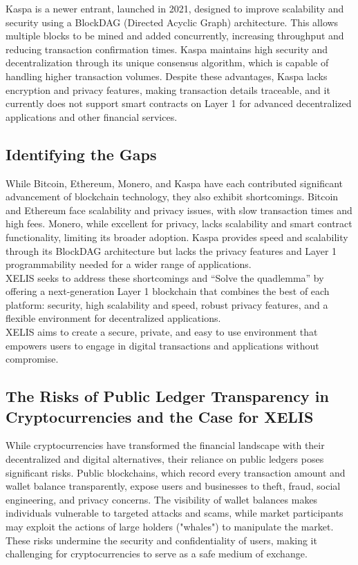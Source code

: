 \documentclass[10pt,a4paper,twocolumn]{article}
\begin{document}
Kaspa is a newer entrant, launched in 2021, designed to improve scalability and security using a BlockDAG (Directed Acyclic Graph) architecture. This allows multiple blocks to be mined and added concurrently, increasing throughput and reducing transaction confirmation times. Kaspa maintains high security and decentralization through its unique consensus algorithm, which is capable of handling higher transaction volumes. Despite these advantages, Kaspa lacks encryption and privacy features, making transaction details traceable, and it currently does not support smart contracts on Layer 1 for advanced decentralized applications and other financial services.\\


\subsection{Identifying the Gaps}

While Bitcoin, Ethereum, Monero, and Kaspa have each contributed significant advancement of blockchain technology, they also exhibit shortcomings. Bitcoin and Ethereum face scalability and privacy issues, with slow transaction times and high fees. Monero, while excellent for privacy, lacks scalability and smart contract functionality, limiting its broader adoption. Kaspa provides speed and scalability through its BlockDAG architecture but lacks the privacy features and Layer 1 programmability needed for a wider range of applications.\\

XELIS seeks to address these shortcomings and “Solve the quadlemma” by offering a next-generation Layer 1 blockchain that combines the best of each platform: security, high scalability and speed, robust privacy features, and a flexible environment for decentralized applications.\\

XELIS aims to create a secure, private, and easy to use environment that empowers users to engage in digital transactions and applications without compromise.\\


\subsection{The Risks of Public Ledger Transparency in Cryptocurrencies and the Case for XELIS}

While cryptocurrencies have transformed the financial landscape with their decentralized and digital alternatives, their reliance on public ledgers poses significant risks. Public blockchains, which record every transaction amount and wallet balance transparently, expose users and businesses to theft, fraud, social engineering, and privacy concerns. The visibility of wallet balances makes individuals vulnerable to targeted attacks and scams, while market participants may exploit the actions of large holders ("whales") to manipulate the market. These risks undermine the security and confidentiality of users, making it challenging for cryptocurrencies to serve as a safe medium of exchange.\\
\end{document}
